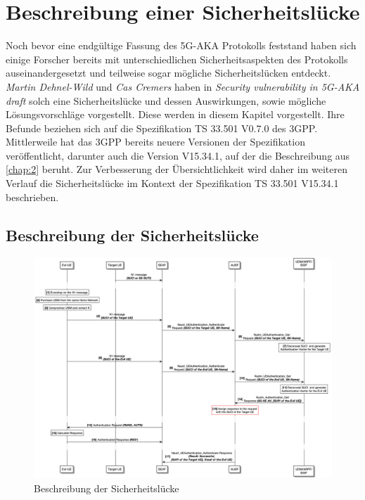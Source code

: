 \chapter{Beschreibung einer Sicherheitsl\"ucke}
\label{chap:4}

Noch bevor eine endgültige Fassung des 5G-AKA Protokolls feststand haben sich einige Forscher bereits mit unterschiedlichen Sicherheitsaspekten des Protokolls auseinandergesetzt und teilweise sogar mögliche Sicherheitslücken entdeckt.
\textit{Martin Dehnel-Wild} und \textit{Cas Cremers} haben in \textit{Security vulnerability in 5G-AKA draft} solch eine Sicherheitslücke und dessen Auswirkungen, sowie mögliche Lösungsvorschläge vorgestellt. %
Diese werden in diesem Kapitel vorgestellt.
Ihre Befunde beziehen sich auf die Spezifikation TS 33.501 V0.7.0 des 3GPP. %
Mittlerweile hat das 3GPP bereits neuere Versionen der Spezifikation veröffentlicht, darunter auch die Version V15.34.1, auf der die Beschreibung aus \cref{chap:2} beruht. %
Zur Verbesserung der Übersichtlichkeit wird daher im weiteren Verlauf die Sicherheitslücke im Kontext der Spezifikation TS 33.501 V15.34.1 beschrieben.


\section{Beschreibung der Sicherheitslücke}

\begin{figure}[H]
  \centering
  \includegraphics[width=\textwidth]{uml/vulnerability_v1.png}
  \caption{Beschreibung der Sicherheitslücke}
  \label{fig:vulnerability_v1}
\end{figure}

